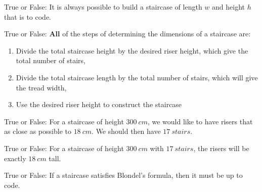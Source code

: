 \documentclass[noauthor,nooutcomes,12pt]{ximera}
\author{Claire Merriman}
\begin{document}
\maketitle



\begin{exercise}
  True or False: It is always possible to build a staircase of length $w$ and height $h$ that is to code. 
\end{exercise}


\begin{exercise}
   True or False: \textbf{All} of the steps of determining the dimensions of a staircase are:
   
\begin{enumerate}
 \item Divide the total staircase height by the desired riser height, which give the total number of stairs,
 \item Divide the total staircase length by the total number of stairs, which will give the tread width,
 \item Use the desired riser height to construct the staircase
\end{enumerate}
\end{exercise}


\begin{exercise} True or False: 
 For a staircase of height $300\ cm$, we would like to have risers that as close as possible to $18\ cm$. We should then have $17\ stairs$.
\end{exercise}

\begin{exercise} True or False: 
 For a staircase of height $300\ cm$ with $17\ stairs$, the risers will be exactly $18\ cm$ tall.
\end{exercise}

\begin{exercise} True or False: 
  If a staircase satisfies Blondel's formula, then it must be up to code.
\end{exercise}

\end{document}
